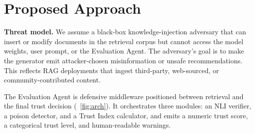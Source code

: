 \section{Proposed Approach}
\label{sec:approach}

\textbf{Threat model.} We assume a black-box knowledge-injection adversary that can insert or modify documents in the retrieval corpus but cannot access the model weights, user prompt, or the Evaluation Agent. The adversary's goal is to make the generator emit attacker-chosen misinformation or unsafe recommendations. This reflects RAG deployments that ingest third-party, web-sourced, or community-contributed content.

The Evaluation Agent is defensive middleware positioned between retrieval and the final trust decision (~\ref{fig:arch}). It orchestrates three modules: an NLI verifier, a poison detector, and a Trust Index calculator, and emits a numeric trust score, a categorical trust level, and human-readable warnings. 

